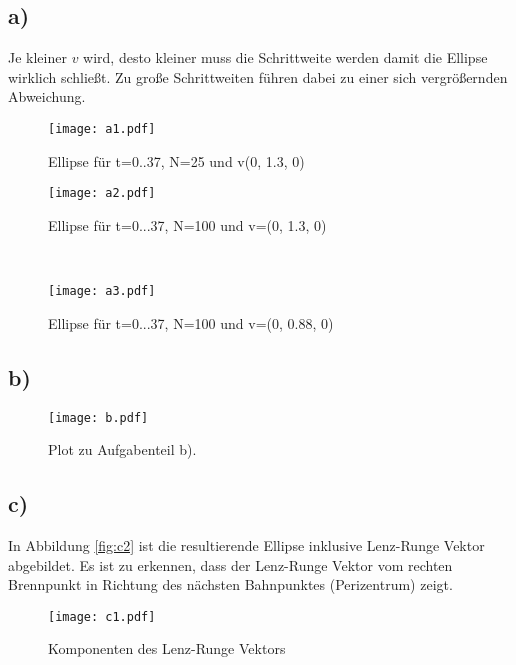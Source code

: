 \documentclass[paper=a4, ngerman]{scrartcl}
\begin{document}
\subsection{a)}

Je kleiner $v$ wird, desto kleiner muss die Schrittweite werden damit die Ellipse wirklich schließt. Zu große Schrittweiten führen dabei zu einer sich vergrößernden Abweichung.

\begin{figure}[!h]
	\centering
	\texttt{[image: a1.pdf]}
	\caption{Ellipse für t=0..37, N=25  und v(0, 1.3, 0)}
	\label{fig:a1}
\end{figure}

\begin{figure}[htbp]
    \centering
    \begin{minipage}{.99\textwidth}
		\centering
		\texttt{[image: a2.pdf]}
		\caption{Ellipse für t=0...37, N=100 und v=(0, 1.3, 0)}
		\label{fig:a2}
    \end{minipage}\\
    \begin{minipage}{.99\textwidth}
		\centering
		\texttt{[image: a3.pdf]}
		\caption{Ellipse für t=0...37, N=100 und v=(0, 0.88, 0)}
		\label{fig:a3}
    \end{minipage}
\end{figure} 

\FloatBarrier
\subsection{b)}

\begin{figure}[htbp]
	\centering
	\texttt{[image: b.pdf]}
	\caption{Plot zu Aufgabenteil b).}
	\label{fig:b}
\end{figure}

\FloatBarrier
\subsection{c)}
In Abbildung \ref{fig:c2} ist die resultierende Ellipse inklusive Lenz-Runge Vektor abgebildet. Es ist zu erkennen, dass der Lenz-Runge Vektor vom rechten Brennpunkt in Richtung des nächsten Bahnpunktes (Perizentrum) zeigt.

\begin{figure}[htbp]
	\centering
	\texttt{[image: c1.pdf]}
	\caption{Komponenten des Lenz-Runge Vektors}
	\label{fig:c1}
\end{figure}
\end{document}

